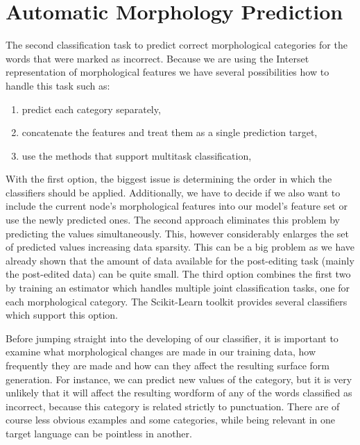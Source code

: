 \section{Automatic Morphology Prediction}

The second classification task to predict correct morphological categories for
the words that were marked as incorrect. Because we are using the Interset representation
of morphological features we have several possibilities how to handle this task such
as:
\begin{enumerate}
    \item predict each category separately,
    \item concatenate the features and treat them as a single prediction target,
    \item use the methods that support multitask classification,
\end{enumerate}

With the first option, the biggest issue is determining the order in which the classifiers
should be applied. Additionally, we have to decide if we also want to include the current node's morphological features
into our model's feature set or use the newly predicted ones. The second approach eliminates this problem by predicting the
values simultaneously.
This, however considerably enlarges the set of predicted values increasing data sparsity.
This can be a big problem as we have
already shown that the amount of data available for the post-editing task (mainly the post-edited
data) can be quite small. The third option combines the first two by training an estimator
which handles multiple joint classification tasks, one for each morphological category. The
Scikit-Learn toolkit provides several classifiers which support this option.

Before jumping straight into the developing of our classifier, it is important to examine what morphological
changes are made in our training data, how frequently they are made and how can they affect the resulting
surface form generation. For instance, we can predict new values of the  category,
but it is very unlikely that it will affect the resulting wordform of any of the words
classified as incorrect, because this category is related strictly to punctuation. There are
of course less obvious examples and some categories, while being relevant in one target language
can be pointless in another.

